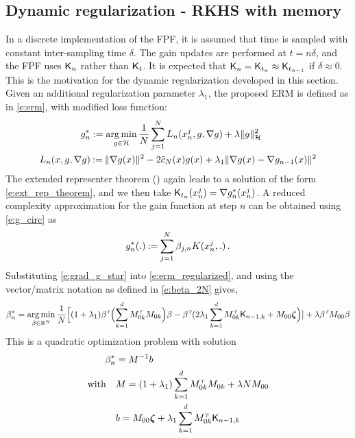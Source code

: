 \subsection{Dynamic regularization - RKHS with memory}
\label{s:fpf_rkhs_memory}
In a discrete implementation of the FPF, it is assumed that time is sampled with constant inter-sampling time $\delta$. The gain updates are performed at $t = n \delta$, and the FPF uses $\text{\sf K}_n$ rather than $\text{\sf K}_t$. It is expected that $\text{\sf K}_{n} = \text{\sf K}_{t_n}  \approx \text{\sf K}_{t_{n-1}}$ if $\delta\approx 0$.   This is the motivation for the dynamic regularization developed in this section.    Given an additional regularization parameter $\lambda_1$,  the proposed ERM is defined as in \eqref{e:erm},  with modified loss function:
\begin{equation}
\begin{aligned}
g^*_n & := \argmin_{g \in \clH} \frac{1}{N} \sum_{j=1}^N  L_n(x_n^j,g,\nabla g) + \lambda \|g\|^2_\clH
\\
L_n(x,g,\nabla g) &  \eqdef  \| \nabla g(x) \|^2 - 2 \tilc_N(x)g(x)  + \lambda_1 \|\nabla g(x) -  \nabla g_{n-1}(x)\|^2
\end{aligned}
\label{e:erm_regularized}
\end{equation}
The extended representer theorem () again leads to a solution of the form \eqref{e:ext_rep_theorem}, and we then take
$ \text{\sf K}_{t_n}(x^j_n) = \nabla g^*_n(x^j_n)$. A reduced complexity approximation for the gain function at step $n$ can be obtained using \eqref{e:g_circ} as
\begin{equation}
g^*_n(.)  \eqdef \sum_{j=1}^N \beta_{j,n} \Kern(x^j_n, . ) \, .
\label{e:grad_g_star}
\end{equation}
Substituting \eqref{e:grad_g_star} into \eqref{e:erm_regularized}, and using the vector/matrix notation as defined in \eqref{e:beta_2N} gives,
\begin{equation}
\beta ^*_n =
\mathop{\rm arg{\,}min}_{\beta  \in \mathbb{R}^N}  \frac{1}{N} \Bigl[ (1 + \lambda_1) \beta ^{\hbox{\tiny\it T}} \Bigl( \sum_{k=1}^d M_{0k}^{\hbox{\tiny\it T}} M_{0k} \Bigr) \beta  -  \beta ^{\hbox{\tiny\it T}}  ( 2 \lambda_1 \sum_{k=1}^d M_{0k}^{\hbox{\tiny\it T}} \text{\sf K}_{n-1,k} +M_{00} \boldsymbol{\zeta}  \Bigr) ] + \lambda \beta ^{\hbox{\tiny\it T}} M_{00} \beta
\end{equation}
This is a quadratic optimization problem with solution
\begin{equation}
\begin{aligned}
\beta ^*_n  &= M^{-1} b
\\
\text{with} \quad
&
M =  (1+ \lambda_1)\sum_{k=1}^d M_{0k}^\transpose M_{0k} + \lambda N M_{00}
\\
&b =  M_{00} \boldsymbol{\zeta}  + \lambda_1 \sum_{k =1}^d  M_{0k}^\transpose \kFPF_{n-1,k}
\end{aligned}
\label{e:beta_n}
\end{equation}

